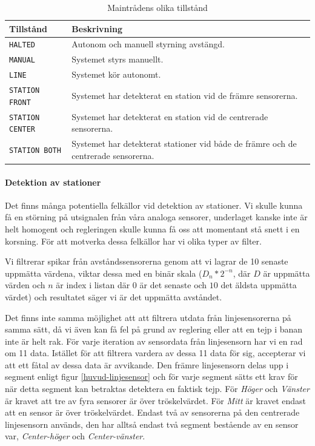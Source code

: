 \begin{table}[h!]
	\centering
	\begin{tabularx}{\textwidth}{| l | X |}
		\hline
		{\textbf{Tillstånd}} & {\textbf{Beskrivning}} \\\hline
		{\texttt{HALTED}} & {Autonom och manuell styrning avstängd.} \\\hline
		{\texttt{MANUAL}} & {Systemet styrs manuellt.} \\\hline
		{\texttt{LINE}} & {Systemet kör autonomt.} \\\hline
		{\texttt{STATION FRONT}} & {Systemet har detekterat en station vid de främre sensorerna.} \\\hline
		{\texttt{STATION CENTER}} & {Systemet har detekterat en station vid de centrerade sensorerna.} \\\hline
		{\texttt{STATION BOTH}} & {Systemet har detekterat stationer vid både de främre och de centrerade sensorerna.} \\\hline
	\end{tabularx}
	\caption{Maintrådens olika tillstånd} \label{huvud-tillstand}
\end{table}

\paragraph{Detektion av stationer}

Det finns många potentiella felkällor vid detektion av stationer. Vi skulle kunna få en störning på utsignalen från våra analoga sensorer, underlaget kanske inte är helt homogent och regleringen skulle kunna få oss att momentant stå snett i en korsning. För att motverka dessa felkällor har vi olika typer av filter.

Vi filtrerar spikar från avståndssensorerna genom att vi lagrar de 10 senaste uppmätta värdena, viktar dessa med en binär skala ($D_{n}*2^{-n}$, där $D$ är uppmätta värden och $n$ är index i listan där $0$ är det senaste och $10$ det äldsta uppmätta värdet) och resultatet säger vi är det uppmätta avståndet.

Det finns inte samma möjlighet att att filtrera utdata från linjesensorerna på samma sätt, då vi även kan få fel på grund av reglering eller att en tejp i banan inte är helt rak. För varje iteration av sensordata från linjesensorn har vi en rad om 11 data. Istället för att filtrera vardera av dessa 11 data för sig, accepterar vi att ett fåtal av dessa data är avvikande. Den främre linjesensorn delas upp i segment enligt figur \ref{huvud-linjesensor} och för varje segment sätts ett krav för när detta segment kan betraktas detektera en faktisk tejp. För \textit{Höger} och \textit{Vänster} är kravet att tre av fyra sensorer är över tröskelvärdet. För \textit{Mitt} är kravet endast att en sensor är över tröskelvärdet. Endast två av sensorerna på den centrerade linjesensorn används, den har alltså endast två segment bestående av en sensor var, \textit{Center-höger} och \textit{Center-vänster}.

